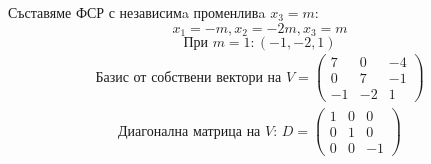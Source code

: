 \documentclass{article}
\begin{document}
Съставяме ФСР с независимa променливa $x_3=m$:
\[
    x_1=-m, x_2=-2m, x_3=m
\]
\[
    \text{При } m=1: (-1, -2, 1)
\]
\begin{align*}
    \text{Базис от собствени вектори на }V=
    \left(\begin{array}{ccc}
                  7  & 0  & -4 \\
                  0  & 7  & -1 \\
                  -1 & -2 & 1
              \end{array}
    \right)
\end{align*}
\begin{align*}
    \text{Диагонална матрица на $V$: }D=
    \left(\begin{array}{ccc}
                  1 & 0 & 0  \\
                  0 & 1 & 0  \\
                  0 & 0 & -1
              \end{array}
    \right)
\end{align*}
\end{document}
